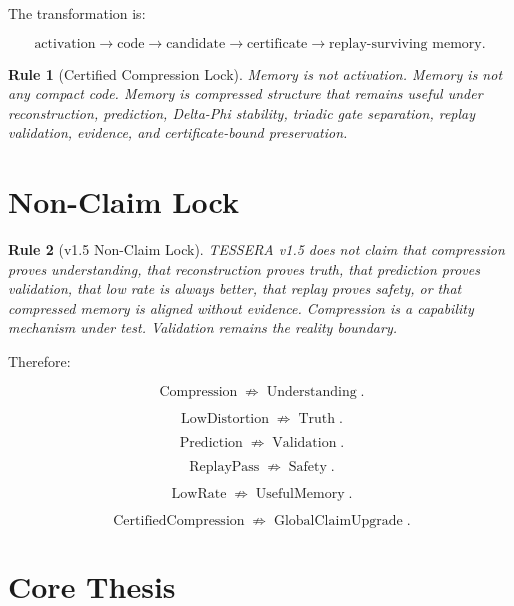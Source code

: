 \documentclass[12pt]{article}
\newtheorem{rulebox}{Rule}
\begin{document}
The transformation is:

\[
\text{activation} \rightarrow \text{code} \rightarrow \text{candidate}
\rightarrow \text{certificate} \rightarrow \text{replay-surviving memory}.
\]

\begin{rulebox}[Certified Compression Lock]
Memory is not activation. Memory is not any compact code. Memory is compressed
structure that remains useful under reconstruction, prediction, Delta-Phi
stability, triadic gate separation, replay validation, evidence, and
certificate-bound preservation.
\end{rulebox}

\section{Non-Claim Lock}

\begin{rulebox}[v1.5 Non-Claim Lock]
TESSERA v1.5 does not claim that compression proves understanding, that
reconstruction proves truth, that prediction proves validation, that low rate is
always better, that replay proves safety, or that compressed memory is aligned
without evidence. Compression is a capability mechanism under test. Validation
remains the reality boundary.
\end{rulebox}

Therefore:

\[
\operatorname{Compression}\not\Rightarrow\operatorname{Understanding}.
\]

\[
\operatorname{LowDistortion}\not\Rightarrow\operatorname{Truth}.
\]

\[
\operatorname{Prediction}\not\Rightarrow\operatorname{Validation}.
\]

\[
\operatorname{ReplayPass}\not\Rightarrow\operatorname{Safety}.
\]

\[
\operatorname{LowRate}\not\Rightarrow\operatorname{UsefulMemory}.
\]

\[
\operatorname{CertifiedCompression}\not\Rightarrow\operatorname{GlobalClaimUpgrade}.
\]

\section{Core Thesis}
\end{document}
